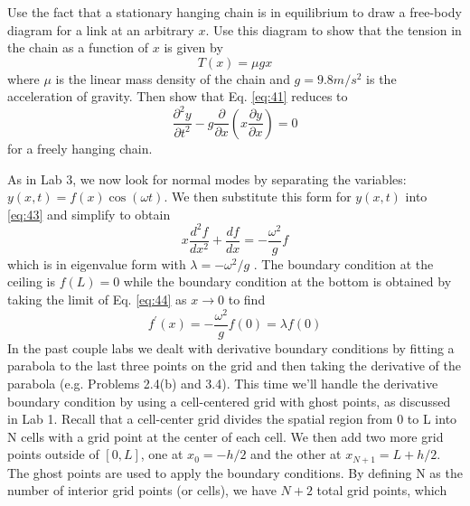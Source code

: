 \begin{problem} \label{P4.1}
Use the fact that a stationary hanging chain is in equilibrium to draw a
free-body diagram for a link at an arbitrary $x$. Use this diagram to show that
the tension in the chain as a function of $x$ is given by
	\begin{equation}\label{eq:42}
		T(x) = \mu g x
				\end{equation}		
				where $\mu$ is the linear mass density of the chain and $g = 9.8 m/s^2$
is the acceleration of gravity. Then show that Eq. \eqref{eq:41} reduces to	
	\begin{equation}\label{eq:43}
		 \frac{\partial^2 y}{\partial t^2} - g\frac{\partial}{\partial x}(x\frac{\partial y}{\partial x}) = 0
				\end{equation}	
			for a freely hanging chain. \end{problem}
			As in Lab 3, we now look for normal modes by separating the variables:
$y(x,t) = f(x)\cos(\omega t)$. We then substitute this form for $y(x,t)$ into \eqref{eq:43} and simplify to obtain	
		\begin{equation}\label{eq:44}
		 x \frac{d^2 f}{dx^2}+\frac{df}{dx} = - \frac{\omega^2}{g}f
				\end{equation}		
				which is in eigenvalue form with $ \lambda = −\omega^2/g$ . The boundary condition at the
ceiling is $f (L) = 0$ while the boundary condition at the bottom is obtained by
taking the limit of Eq. \eqref{eq:44} as $x \rightarrow 0$ to find
	\begin{equation}\label{eq:45}
		f^\prime(x) = - \frac{\omega^2}{g}f(0) = \lambda f(0)
				\end{equation}		
				In the past couple labs we dealt with derivative boundary conditions by fitting
a parabola to the last three points on the grid and then taking the derivative of
the parabola (e.g. Problems 2.4(b) and 3.4). This time we\rq ll handle the derivative
boundary condition by using a cell-centered grid with ghost points, as discussed
in Lab 1. Recall that a cell-center grid divides the spatial region from 0 to L into
N cells with a grid point at the center of each cell. We then add two more grid
points outside of $[0,L]$, one at $x_0  = −h/2$ and the other at $x_{N+1} = L + h/2$. The
ghost points are used to apply the boundary conditions. By defining N as the
number of interior grid points (or cells), we have $N +2$ total grid points, which
